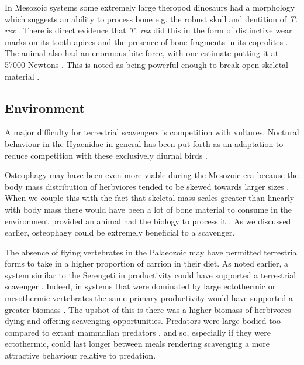 \documentclass[a4paper,12pt]{article}
\begin{document}
In Mesozoic systems some extremely large theropod dinosaurs had a morphology which suggests an ability to process bone e.g. the robust skull and dentition of \textit{T. rex} \citep{hone2010feeding}.
There is direct evidence that \textit{T. rex} did this in the form of distinctive wear marks on its tooth apices \citep{farlow1994wear,schubert2005wear} and the presence of bone fragments in its coprolites \citep{chin1998king}.
The animal also had an enormous bite force, with one estimate putting it at 57000 Newtons \citep{bates2012estimating}.
This is noted as being powerful enough to break open skeletal material \citep{rayfield2001cranial}.

\subsection*{Environment}
A major difficulty for terrestrial scavengers is competition with vultures.
Noctural behaviour in the Hyaenidae in general has been put forth as an adaptation to reduce competition with these exclusively diurnal birds \citep{gittleman2013carnivore}.

Osteophagy may have been even more viable during the Mesozoic era because the body mass distribution of herbviores tended to be skewed towards larger sizes \citep{10.1371/journal.pone.0051925}.
When we couple this with the fact that skeletal mass scales greater than linearly with body mass \citep{prange1979scaling} there would have been a lot of bone material to consume in the environment provided an animal had the biology to process it \citep{chure1997one}.
As we discussed earlier, osteophagy could be extremely beneficial to a scavenger.

The absence of flying vertebrates in the Palaeozoic may have permitted terrestrial forms to take in a higher proportion of carrion in their diet.
As noted earlier, a system similar to the Serengeti in productivity could have supported a terrestrial scavenger \citep{ruxton2004obligate}.
Indeed, in systems that were dominated by large ectothermic or mesothermic vertebrates 
the same primary productivity would have supported a greater biomass \citep{mcnab2009resources}.
The upshot of this is there was a higher biomass of herbivores dying and offering scavenging opportunities.
Predators were large bodied too compared to extant mammalian predators \citep{mcnab2009resources}, and so, especially if they were ectothermic, could last longer between meals rendering scavenging a more attractive behaviour relative to predation.
\end{document}
